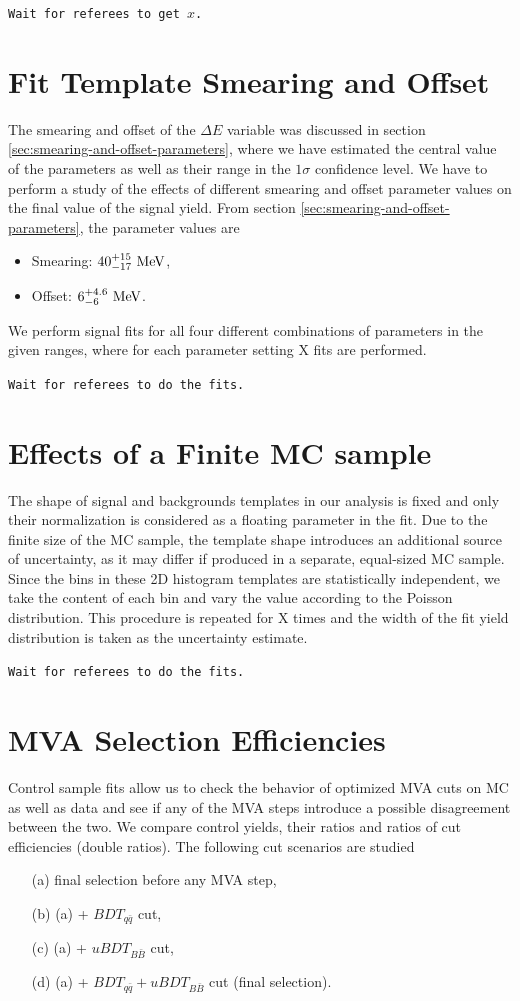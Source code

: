 \texttt{Wait for referees to get $x$.}


\section{Fit Template Smearing and Offset}
The smearing and offset of the $\Delta E$ variable was discussed in section \ref{sec:smearing-and-offset-parameters}, where we have estimated the central value of the parameters as well as their range in the $1\sigma$ confidence level. We have to perform a study of the effects of different smearing and offset parameter values on the final value of the signal yield. From section \ref{sec:smearing-and-offset-parameters}, the parameter values are
\begin{itemize}
	\item Smearing: $40_{-17}^{+15}\mathrm{~MeV}$,
	\item Offset: $6_{-6}^{+4.6}\mathrm{~MeV}$.
\end{itemize}
We perform signal fits for all four different combinations of parameters in the given ranges, where for each parameter setting X fits are performed.

\texttt{Wait for referees to do the fits.}

\section{Effects of a Finite MC sample}
The shape of signal and backgrounds templates in our analysis is fixed and only their normalization is considered as a floating parameter in the fit. Due to the finite size of the MC sample, the template shape introduces an additional source of uncertainty, as it may differ if produced in a separate, equal-sized MC sample. Since the bins in these 2D histogram templates are statistically independent, we take the content of each bin and vary the value according to the Poisson distribution. This procedure is repeated for X times and the width of the fit yield distribution is taken as the uncertainty estimate.

\texttt{Wait for referees to do the fits.}

\section{MVA Selection Efficiencies}
Control sample fits allow us to check the behavior of optimized MVA cuts on MC as well as data and see if any of the MVA steps introduce a possible disagreement between the two. We compare control yields, their ratios and ratios of cut efficiencies (double ratios). The following cut scenarios are studied
\begin{itemize}
	\item[(a)] final selection before any MVA step,
	\item[(b)] (a) + $BDT_{q\bar q}$ cut,
	\item[(c)] (a) + $uBDT_{B\bar B}$ cut,
	\item[(d)] (a) + $BDT_{q\bar q} + uBDT_{B\bar B}$ cut (final selection).
\end{itemize}

